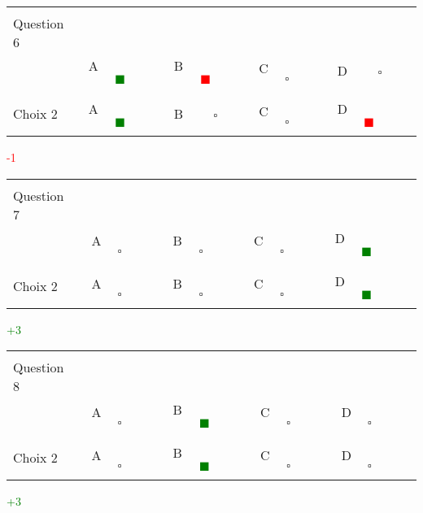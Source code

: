 \documentclass{book}%
\begin{document}
\thispagestyle{empty}%
\begin{center}%
\begin{tabular}{| l  l  l  l  l |}%
\hline%
 & & & & \\%
Question 6\qquad \qquad\ & & & & \\%
& A \textcolor{green}{$\qquad \blacksquare \qquad$}& B \textcolor{red}{$\qquad \blacksquare \qquad$}& C $\qquad \square \qquad$& D $\qquad \square \qquad$\\%
 & & & & \\%
\hline%
 & & & &  \\%
Choix 2& A \textcolor{green}{$\qquad \blacksquare \qquad$}& B $\qquad \square \qquad$& C $\qquad \square \qquad$& D \textcolor{red}{$\qquad \blacksquare \qquad$}\\%
 & & & &  \\%
\hline%
\end{tabular}%
 \qquad  \textcolor{red}{-1}%
\\ \vskip3mm%
\end{center}%
\thispagestyle{empty}%
\begin{center}%
\begin{tabular}{| l  l  l  l  l |}%
\hline%
 & & & & \\%
Question 7\qquad \qquad\ & & & & \\%
& A $\qquad \square \qquad$& B $\qquad \square \qquad$& C $\qquad \square \qquad$& D \textcolor{green}{$\qquad \blacksquare \qquad$}\\%
 & & & & \\%
\hline%
 & & & &  \\%
Choix 2& A $\qquad \square \qquad$& B $\qquad \square \qquad$& C $\qquad \square \qquad$& D \textcolor{green}{$\qquad \blacksquare \qquad$}\\%
 & & & &  \\%
\hline%
\end{tabular}%
 \qquad  \textcolor{green}{+3}%
\\ \vskip3mm%
\end{center}%
\thispagestyle{empty}%
\begin{center}%
\begin{tabular}{| l  l  l  l  l |}%
\hline%
 & & & & \\%
Question 8\qquad \qquad\ & & & & \\%
& A $\qquad \square \qquad$& B \textcolor{green}{$\qquad \blacksquare \qquad$}& C $\qquad \square \qquad$& D $\qquad \square \qquad$\\%
 & & & & \\%
\hline%
 & & & &  \\%
Choix 2& A $\qquad \square \qquad$& B \textcolor{green}{$\qquad \blacksquare \qquad$}& C $\qquad \square \qquad$& D $\qquad \square \qquad$\\%
 & & & &  \\%
\hline%
\end{tabular}%
 \qquad  \textcolor{green}{+3}%
\\ \vskip3mm%
\end{center}%
\end{document}
